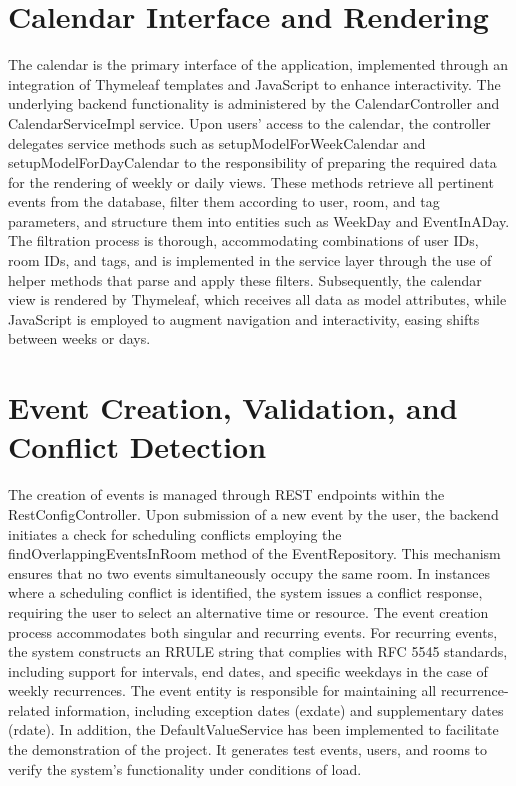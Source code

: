 \section{Calendar Interface and Rendering}\label{sec:calendar-interface-and-rendering}
The calendar is the primary interface of the application, implemented through an integration of Thymeleaf templates and JavaScript to enhance interactivity.
The underlying backend functionality is administered by the CalendarController and CalendarServiceImpl service.
Upon users' access to the calendar, the controller delegates service methods such as setupModelForWeekCalendar and setupModelForDayCalendar to the responsibility of preparing the required data for the rendering of weekly or daily views.
These methods retrieve all pertinent events from the database, filter them according to user, room, and tag parameters, and structure them into entities such as WeekDay and EventInADay.
The filtration process is thorough, accommodating combinations of user IDs, room IDs, and tags, and is implemented in the service layer through the use of helper methods that parse and apply these filters.
Subsequently, the calendar view is rendered by Thymeleaf, which receives all data as model attributes, while JavaScript is employed to augment navigation and interactivity, easing shifts between weeks or days.


\section{Event Creation, Validation, and Conflict Detection}\label{sec:event-creation-validation-and-conflict-detection}
The creation of events is managed through REST endpoints within the RestConfigController.
Upon submission of a new event by the user, the backend initiates a check for scheduling conflicts employing the findOverlappingEventsInRoom method of the EventRepository.
This mechanism ensures that no two events simultaneously occupy the same room.
In instances where a scheduling conflict is identified, the system issues a conflict response, requiring the user to select an alternative time or resource.
The event creation process accommodates both singular and recurring events.
For recurring events, the system constructs an RRULE string that complies with RFC 5545 standards, including support for intervals, end dates, and specific weekdays in the case of weekly recurrences.
The event entity is responsible for maintaining all recurrence-related information, including exception dates (exdate) and supplementary dates (rdate).
In addition, the DefaultValueService has been implemented to facilitate the demonstration of the project.
It generates test events, users, and rooms to verify the system's functionality under conditions of load.



